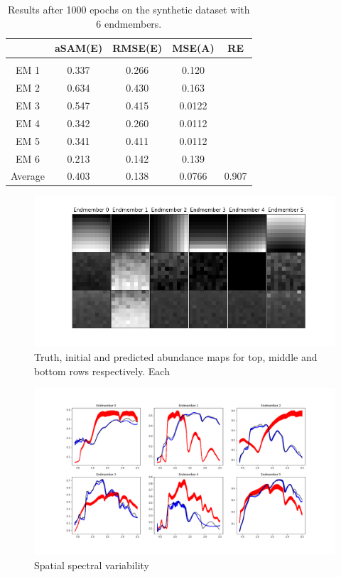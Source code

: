 \documentclass{article}
\begin{document}
\begin{table}
\centering
\begin{tabular}{ccccc}
{} & {\bf aSAM(E)} & {\bf RMSE(E)} & {\bf MSE(A)} & {\bf RE} \\
\hline & \\[-1.5ex]
EM 1 & 0.337 & 0.266 & 0.120 &  \\
EM 2 & 0.634 & 0.430 & 0.163 &   \\
EM 3 & 0.547 & 0.415 & 0.0122 &   \\
EM 4 & 0.342 & 0.260 & 0.0112 &  \\
EM 5 & 0.341 & 0.411 & 0.0112 &  \\
EM 6 & 0.213 & 0.142 & 0.139 &  \\
Average & 0.403 & 0.138 & 0.0766 & 0.907 \\
\end{tabular}
\caption{Results after 1000 epochs on the synthetic dataset with 6 endmembers.}
\label{table:results-6}
\end{table}

\begin{figure}[!t]
    \centering
    \includegraphics[width=\textwidth]{pictures/abundance_maps.png}
    \caption{Truth, initial and predicted abundance maps for top, middle and bottom rows respectively. Each }
    \label{fig:ab_maps}
\end{figure}

\begin{figure}[!t]
    \centering
    \includegraphics[width=\textwidth]{pictures/spectral_variab.png}
    \caption{Spatial spectral variability}
    \label{fig:variab}
\end{figure}
\end{document}
